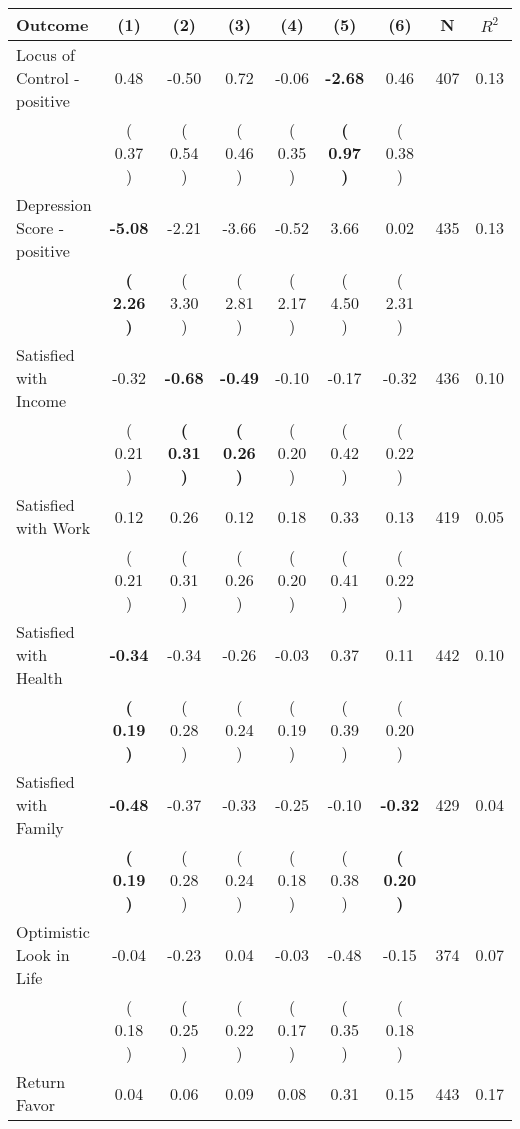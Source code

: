 \begin{tabular}{lcccccccc}
\toprule
 \textbf{Outcome} & \textbf{(1)} & \textbf{(2)} & \textbf{(3)} & \textbf{(4)} & \textbf{(5)} & \textbf{(6)} & \textbf{N} & \textbf{$ R^2$} \\
\midrule
Locus of Control - positive &      0.48 &     -0.50 &      0.72 &     -0.06 & \textbf{    -2.68} &      0.46 & 407 &       0.13 \\ 
 & (     0.37 ) & (     0.54 ) & (     0.46 ) & (     0.35 ) & \textbf{(     0.97 )} & (     0.38 ) & \\
Depression Score - positive & \textbf{    -5.08} &     -2.21 &     -3.66 &     -0.52 &      3.66 &      0.02 & 435 &       0.13 \\ 
 & \textbf{(     2.26 )} & (     3.30 ) & (     2.81 ) & (     2.17 ) & (     4.50 ) & (     2.31 ) & \\
Satisfied with Income &     -0.32 & \textbf{    -0.68} & \textbf{    -0.49} &     -0.10 &     -0.17 &     -0.32 & 436 &       0.10 \\ 
 & (     0.21 ) & \textbf{(     0.31 )} & \textbf{(     0.26 )} & (     0.20 ) & (     0.42 ) & (     0.22 ) & \\
Satisfied with Work &      0.12 &      0.26 &      0.12 &      0.18 &      0.33 &      0.13 & 419 &       0.05 \\ 
 & (     0.21 ) & (     0.31 ) & (     0.26 ) & (     0.20 ) & (     0.41 ) & (     0.22 ) & \\
Satisfied with Health & \textbf{    -0.34} &     -0.34 &     -0.26 &     -0.03 &      0.37 &      0.11 & 442 &       0.10 \\ 
 & \textbf{(     0.19 )} & (     0.28 ) & (     0.24 ) & (     0.19 ) & (     0.39 ) & (     0.20 ) & \\
Satisfied with Family & \textbf{    -0.48} &     -0.37 &     -0.33 &     -0.25 &     -0.10 & \textbf{    -0.32} & 429 &       0.04 \\ 
 & \textbf{(     0.19 )} & (     0.28 ) & (     0.24 ) & (     0.18 ) & (     0.38 ) & \textbf{(     0.20 )} & \\
Optimistic Look in Life &     -0.04 &     -0.23 &      0.04 &     -0.03 &     -0.48 &     -0.15 & 374 &       0.07 \\ 
 & (     0.18 ) & (     0.25 ) & (     0.22 ) & (     0.17 ) & (     0.35 ) & (     0.18 ) & \\
Return Favor &      0.04 &      0.06 &      0.09 &      0.08 &      0.31 &      0.15 & 443 &       0.17 \\ 

\end{tabular}
